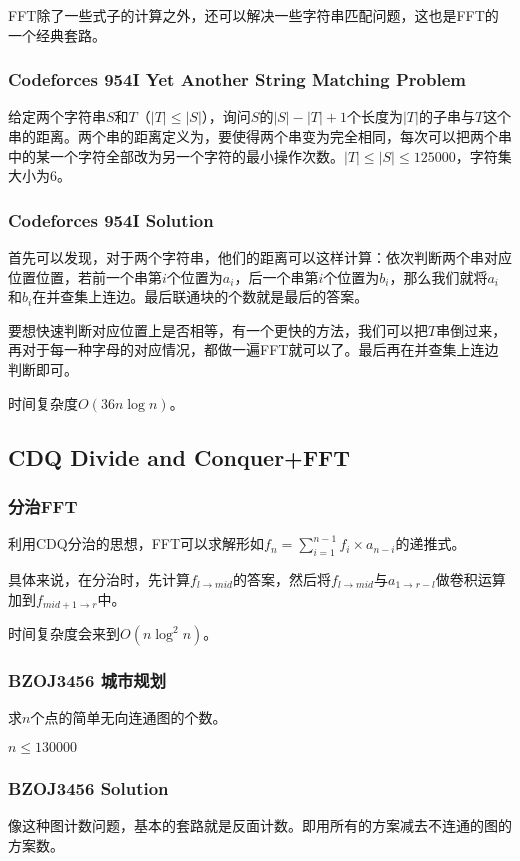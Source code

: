 \documentclass[10pt]{beamer}
\begin{document}
\begin{spacing}{1.2}
\begin{frame}
			FFT除了一些式子的计算之外，还可以解决一些字符串匹配问题，这也是FFT的一个经典套路。
		\end{frame}
		\begin{frame}
			\frametitle{Codeforces 954I Yet Another String Matching Problem}

			给定两个字符串$S$和$T$（$|T| \le |S|$），询问$S$的$|S| - |T| + 1$个长度为$|T|$的子串与$T$这个串的距离。两个串的距离定义为，要使得两个串变为完全相同，每次可以把两个串中的某一个字符全部改为另一个字符的最小操作次数。$|T| \le |S| \le 125000$，字符集大小为$6$。
		\end{frame}
		\begin{frame}
			\frametitle{Codeforces 954I Solution}

			首先可以发现，对于两个字符串，他们的距离可以这样计算：依次判断两个串对应位置位置，若前一个串第$i$个位置为$a_i$，后一个串第$i$个位置为$b_i$，那么我们就将$a_i$和$b_i$在并查集上连边。最后联通块的个数就是最后的答案。 \pause

			要想快速判断对应位置上是否相等，有一个更快的方法，我们可以把$T$串倒过来，再对于每一种字母的对应情况，都做一遍FFT就可以了。最后再在并查集上连边判断即可。 \pause

			时间复杂度$O(36 n \log n)$。

		\end{frame}
		\subsection{CDQ Divide and Conquer+FFT}
		\begin{frame}
			\frametitle{分治FFT}

			利用CDQ分治的思想，FFT可以求解形如$\displaystyle f_n=\sum_{i=1}^{n-1}f_i \times a_{n-i}$的递推式。 \pause

			具体来说，在分治时，先计算$f_{l \to mid}$的答案，然后将$f_{l \to mid}$与$a_{1 \to r-l}$做卷积运算加到$f_{mid+1 \to r}$中。 \pause

			时间复杂度会来到$O(n \log^2 n)$。

		\end{frame}
		\begin{frame}
			\frametitle{BZOJ3456 城市规划}

			求$n$个点的简单无向连通图的个数。 \pause

			$n \le 130000$

		\end{frame}
		\begin{frame}
			\frametitle{BZOJ3456 Solution}

			像这种图计数问题，基本的套路就是反面计数。即用所有的方案减去不连通的图的方案数。 \pause


\end{frame}
\end{spacing}
\end{document}

